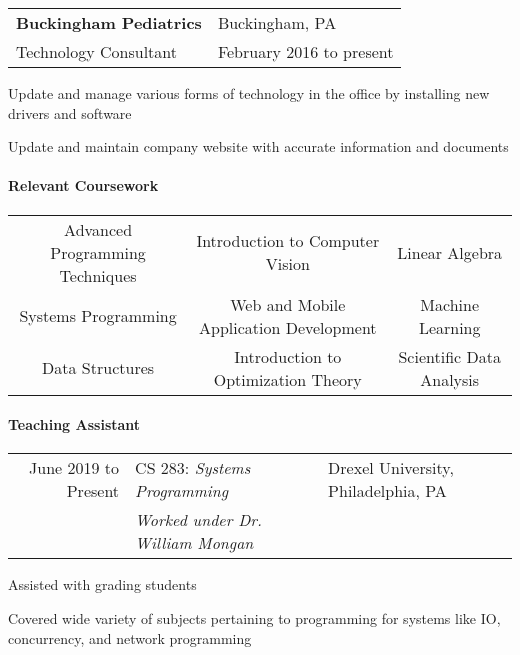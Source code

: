 \documentclass[10pt,]{article}
\let\oldparagraph\paragraph
\renewcommand{\paragraph}[1]{\oldparagraph{#1}\mbox{}}
\begin{document}
\begin{tabularx}{\textwidth}{l X}
    \textbf{Buckingham Pediatrics} & \hfill Buckingham, PA\\
    Technology Consultant          & \hfill February 2016 to present
\end{tabularx}

\begin{list}{\quad}{}
    \item Update and manage various forms of technology in the office by installing new drivers and software
    \item Update and maintain company website with accurate information and documents
\end{list}

\hypertarget{relevant-coursework}{%
\paragraph{Relevant Coursework}\label{relevant-coursework}}

\begin{center}
    \begin{tabularx}{\textwidth}{ccc}
        Advanced Programming Techniques & Introduction to Computer Vision & Linear Algebra\\
        Systems Programming & Web and Mobile Application Development & Machine Learning\\
        Data Structures & Introduction to Optimization Theory & Scientific Data Analysis \\
    \end{tabularx}
\end{center}

\newpage

\hypertarget{teaching-assistant}{%
\paragraph{Teaching Assistant}\label{teaching-assistant}}

\begin{tabularx}{\textwidth}{r | l X}
June 2019 to Present & CS 283: \textit{Systems Programming} & \hfill Drexel University, Philadelphia, PA\\
           & \textit{Worked under Dr. William Mongan}
\end{tabularx}
\begin{list}{\quad}
    \item Assisted with grading students
    \item Covered wide variety of subjects pertaining to programming for systems like IO, concurrency, and network programming
\end{list}
\end{document}
